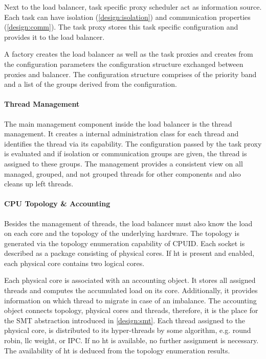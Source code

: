 Next to the load balancer, task specific proxy scheduler act as information
source.
Each task can have isolation (\ref{design:isolation}) and communication
properties (\ref{design:comm}).
The task proxy stores this task specific configuration and provides it to the
load balancer.

A factory creates the load balancer as well as the task proxies and creates
from the configuration parameters the configuration structure exchanged between
proxies and balancer.
The configuration structure comprises of the priority band and a list of
the groups derived from the configuration.


\paragraph{Thread Management}
The main management component inside the load balancer is the thread
management.
It creates a internal administration class for each thread and identifies the
thread via its capability.
The configuration passed by the task proxy is evaluated and if isolation or
communication groups are given, the thread is assigned to these groups.
The management provides a consistent view on all managed, grouped, and not grouped
threads for other components and also cleans up left threads.


\paragraph{CPU Topology \& Accounting}
Besides the management of threads, the load balancer must also know the load on
each core and the topology of the underlying hardware.
The topology is generated via the topology enumeration capability of CPUID.
Each socket is described as a package consisting of physical cores.
If \gls{ht} is present and enabled, each physical core contains two logical
cores.

Each physical core is associated with an accounting object.
It stores all assigned threads and computes the accumulated load on its core.
Additionally, it provides information on which thread to migrate in case of an
imbalance.
The accounting object connects topology, physical cores and threads, therefore,
it is the place for the SMT abstraction introduced in \ref{design:smt}.
Each thread assigned to the physical core, is distributed to its hyper-threads
by some algorithm, e.g. round robin, \gls{llc} weight, or IPC.
If no \gls{ht} is available, no further assignment is necessary.
The availability of \gls{ht} is deduced from the topology enumeration results.


